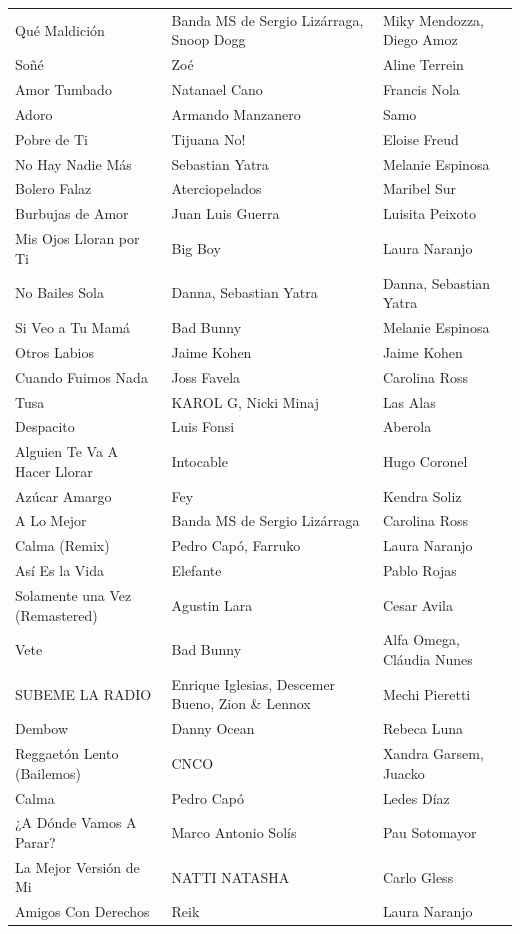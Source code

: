 \begin{longtable}{p{} p{} p{}}
Qué Maldición & Banda MS de Sergio Lizárraga, Snoop Dogg & Miky Mendozza, Diego Amoz \\
Soñé & Zoé & Aline Terrein \\
Amor Tumbado & Natanael Cano & Francis Nola \\
Adoro & Armando Manzanero & Samo \\
Pobre de Ti & Tijuana No! & Eloise Freud \\
No Hay Nadie Más & Sebastian Yatra & Melanie Espinosa \\
Bolero Falaz & Aterciopelados & Maribel Sur \\
Burbujas de Amor & Juan Luis Guerra & Luisita Peixoto \\
Mis Ojos Lloran por Ti & Big Boy & Laura Naranjo \\
No Bailes Sola & Danna, Sebastian Yatra & Danna, Sebastian Yatra \\
Si Veo a Tu Mamá & Bad Bunny & Melanie Espinosa \\
Otros Labios & Jaime Kohen & Jaime Kohen \\
Cuando Fuimos Nada & Joss Favela & Carolina Ross \\
Tusa & KAROL G, Nicki Minaj & Las Alas \\
Despacito & Luis Fonsi & Aberola \\
Alguien Te Va A Hacer Llorar & Intocable & Hugo Coronel \\
Azúcar Amargo & Fey & Kendra Soliz \\
A Lo Mejor & Banda MS de Sergio Lizárraga & Carolina Ross \\
Calma (Remix) & Pedro Capó, Farruko & Laura Naranjo \\
Así Es la Vida & Elefante & Pablo Rojas \\
Solamente una Vez (Remastered) & Agustin Lara & Cesar Avila \\
Vete & Bad Bunny & Alfa Omega, Cláudia Nunes \\
SUBEME LA RADIO & Enrique Iglesias, Descemer Bueno, Zion \& Lennox & Mechi Pieretti \\
Dembow & Danny Ocean & Rebeca Luna \\
Reggaetón Lento (Bailemos) & CNCO & Xandra Garsem, Juacko \\
Calma & Pedro Capó & Ledes Díaz \\
¿A Dónde Vamos A Parar? & Marco Antonio Solís & Pau Sotomayor \\
La Mejor Versión de Mi & NATTI NATASHA & Carlo Gless \\
Amigos Con Derechos & Reik & Laura Naranjo \\

\end{longtable}
